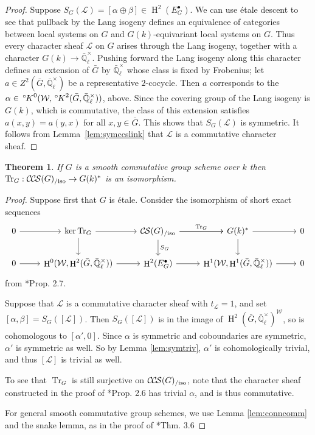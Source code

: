 \documentclass[10pt]{amsart}
\theoremstyle{plain}
\newtheorem{theorem}{Theorem}[section]
\theoremstyle{definition}
\newcommand{\EE}{\mathbb{\bar Q}_\ell}
\newcommand{\Fq}{k}
\newcommand{\EEx}{\EE^\times}
\newcommand{\Weil}[1]{\mathcal{W}_{#1}}
\DeclareMathOperator{\Hh}{H}
\newcommand{\trFrob}[1]{t_{#1}}
\DeclareMathOperator{\Tr}{Tr}
\newcommand{\TrFrob}[1]{\Tr_{#1}}
\newcommand{\cs}[1]{{\mathcal{#1}}}
\newcommand{\CS}{{\mathcal{C\hskip-0.8pt S}}}
\newcommand{\CCS}{{\mathcal{C\hskip-.8pt C\hskip-0.8pt S}}}
\newcommand{\CSiso}[1]{\CS(#1)_{/\text{iso}}}
\newcommand{\CCSiso}[1]{\CCS(#1)_{/\text{iso}}}
\newcommand{\bG}{\bar{G}}
\newcommand{\oK}{{\,^\circ \hskip-1pt K}}
\begin{document}
\begin{proof}
Suppose $S_G(\cs{L}) = [\alpha\oplus \beta]\in \Hh^2(E_G^\bullet)$.
We can use \'etale descent to see that pullback by the Lang isogeny defines an equivalence
of categories between local systems on $G$ and $G(\Fq)$-equivariant local systems on $G$.  
Thus every character sheaf $\cs{L}$ on $G$ arises through the Lang isogeny, together with a character $G(\Fq) \to \EEx$.
Pushing forward the Lang isogeny along this character defines an extension of $\bG$ by $\EEx$ whose class is fixed by Frobenius; let $a\in Z^2(\bG, \EEx)$ be a representative $2$-cocycle.
Then $a$ corresponds to the $\alpha \in \oK^0(\Weil{}, \oK^2(\bG, \EEx))$, above. 
Since the covering group of the Lang isogeny is $G(k)$, which is commutative, the class of this extension satisfies $a(x,y) = a(y,x)$ for all $x,y \in \bG$. 
This shows that $S_{G}(\cs{L})$ is symmetric.
It follows from Lemma~\ref{lem:symccslink} that $\cs{L}$ is a commutative character sheaf.
\end{proof}

\begin{theorem} \label{thm:trfrobiso}
If $G$ is a smooth commutative group scheme over $\Fq$ then $\TrFrob{G} : \CCSiso{G} \to G(\Fq)^*$ is an isomorphism.
\end{theorem}

\begin{proof}
Suppose first that $G$ is \'etale.  Consider the isomorphism of short exact sequences
\[
\begin{tikzcd}
 0 \arrow{r} & \ker \TrFrob{G} \arrow{d} \arrow{r} & \CSiso{G}\arrow{d}{S_G} \arrow{r}{\TrFrob{G}} \arrow{r} & G(\Fq)^* \arrow{d} \arrow{r} & 0\\
  0 \arrow{r} & \Hh^0(\Weil{},\Hh^2(\bG,\EEx)) \arrow{r} & \Hh^2(E^\bullet_G) \arrow{r} & \Hh^1(\Weil{},\Hh^1(\bG,\EEx)) \arrow{r} & 0
 \end{tikzcd}
 \]
from \cite{cunningham-roe:13a}*{Prop. 2.7}.

Suppose that $\cs{L}$ is a commutative character sheaf with $\trFrob{\cs{L}} = 1$, and set $[\alpha, \beta] = S_G([\cs{L}])$.
Then $S_G([\cs{L}])$ is in the image of $\Hh^2(\bG, \EEx)^\Weil{}$, so is cohomologous to
$[\alpha', 0]$.  Since $\alpha$ is symmetric and coboundaries are symmetric, $\alpha'$ is symmetric as well.
So by Lemma \ref{lem:symtriv}, $\alpha'$ is cohomologically trivial, and thus $[\cs{L}]$ is trivial as well.

To see that $\TrFrob{G}$ is still surjective on $\CCSiso{G}$, note that the character sheaf constructed in the proof of
\cite{cunningham-roe:13a}*{Prop. 2.6} has trivial $\alpha$, and is thus commutative.

For general smooth commutative group schemes, we use Lemma \ref{lem:conncomm} and the snake lemma, as in the proof of
\cite{cunningham-roe:13a}*{Thm. 3.6}
\end{proof}
\end{document}
